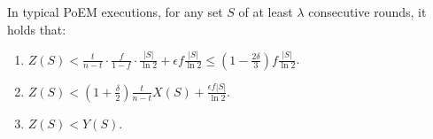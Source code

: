 \begin{lemma} \label{lem:typical-bounds}
  In typical PoEM executions, for any set $S$ of at least $\lambda$ consecutive rounds,
  it holds that:

  \begin{enumerate}
    \item $Z(S) < \frac{t}{n - t} \cdot \frac{f}{1 - f} \cdot \frac{|S|}{\ln2} + \epsilon f \frac{|S|}{\ln2} \leq (1 - \frac{2 \delta}{3}) f \frac{|S|}{\ln2}$. \label{eq.typ-bound-z}
    \item $Z(S) < \left(1 + \frac{\delta}{2}\right)\frac{t}{n - t} X(S) + \frac{\epsilon f |S|}{\ln2}$. \label{eq.typ-bound-z-x}
    \item $Z(S) < Y(S)$. \label{eq.typ-bound-y-z}
  \end{enumerate}
\end{lemma}
